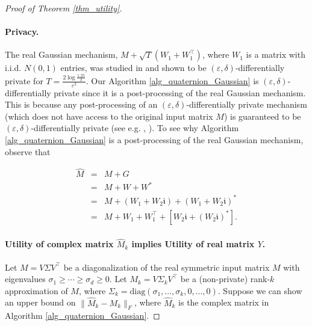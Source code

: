 \documentclass[11pt,letterpaper]{article}
\renewcommand{\epsilon}{\varepsilon}
\newcommand{\eps}{\varepsilon}
\begin{document}
\begin{proof}[Proof of Theorem \ref{thm_utility}] \,

\paragraph{Privacy.}

The real Gaussian mechanism, $M + \sqrt{T}(W_1 + W_1^\top)$, where $W_1$ is a matrix with i.i.d.  $N(0,1)$ entries, was studied in \cite{dwork2014analyze} and shown to be $(\epsilon, \delta)$-differentially private for $T = \frac{2\log\frac{1.25}{\delta}}{\eps^2}$.
%
Our Algorithm \ref{alg_quaternion_Gaussian} is $(\epsilon, \delta)$-differentially private since it is a post-processing of the real Gaussian mechanism.
%
This is because any post-processing of an $(\varepsilon, \delta)$-differentially private mechanism (which does not have access to the original input matrix $M$) is guaranteed to be  $(\varepsilon, \delta)$-differentially private (see e.g. \cite{dwork2006our},  \cite{dwork2014algorithmic}).
% 
To see why Algorithm \ref{alg_quaternion_Gaussian}  is a post-processing of the real Gaussian mechanism, observe that
%

\begin{eqnarray*}
    \hat{M} &=& M + G\\
    &=& M +  W + W^\ast\\
    &=& M +  (W_1 +  W_2 \mathfrak{i}) + (W_1 +  W_2 \mathfrak{i})^\ast\\
    &=& M + W_1 + W_1^\top + [W_2 \mathfrak{i} + (W_2 \mathfrak{i})^\ast].
\end{eqnarray*}




\paragraph{Utility of complex matrix $\hat{M}_k$ implies Utility of real matrix $Y$.}
Let $M = V \Sigma V^\top$ be a diagonalization of the real symmetric input matrix $M$ with eigenvalues $\sigma_1\geq \cdots \geq \sigma_d \geq 0$.
%
Let $M_k = V \Sigma_k V^\top$ be a (non-private) rank-$k$ approximation of $M$, where $\Sigma_k = \mathrm{diag}(\sigma_1,\ldots, \sigma_k, 0, \ldots,0)$.
%
Suppose we can show an upper bound on $\|\hat{M}_k -  M_k\|_F$, where $\hat{M}_k$ is the complex matrix in Algorithm \ref{alg_quaternion_Gaussian}.
%


\end{proof}
\end{document}
